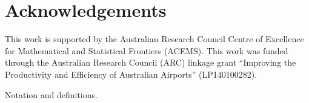 \documentclass[article]{jss}
\begin{document}
\section*{Acknowledgements}

This work is supported by the Australian Research Council Centre of Excellence for Mathematical and Statistical Frontiers (ACEMS). This work was funded through the Australian Research Council (ARC) linkage grant ``Improving the Productivity and Efficiency of Australian Airports” (LP140100282).



\begin{table}
\resizebox{0.9\textwidth}{!}{}
\caption{Notation and definitions.}
\end{table}
\end{document}
